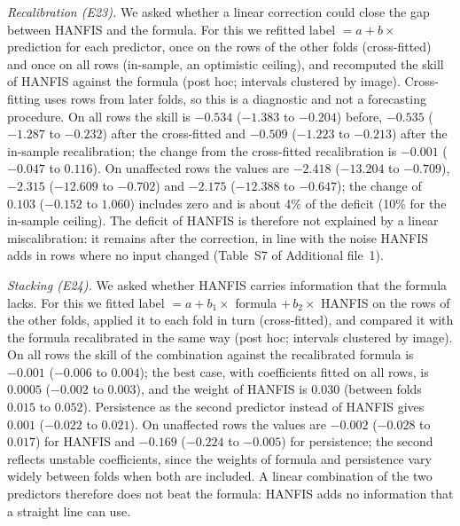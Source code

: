 \documentclass[pdflatex,sn-basic]{sn-jnl}
\theoremstyle{thmstyleone}%
\theoremstyle{thmstyletwo}%
\theoremstyle{thmstylethree}%
\begin{document}
\emph{Recalibration (E23).} We asked whether a linear correction could close the gap between HANFIS and the formula. For this we refitted label $=a+b\times$ prediction for each predictor, once on the rows of the other folds (cross-fitted) and once on all rows (in-sample, an optimistic ceiling), and recomputed the skill of HANFIS against the formula (post hoc; intervals clustered by image). Cross-fitting uses rows from later folds, so this is a diagnostic and not a forecasting procedure. On all rows the skill is $-0.534$ ($-1.383$ to $-0.204$) before, $-0.535$ ($-1.287$ to $-0.232$) after the cross-fitted and $-0.509$ ($-1.223$ to $-0.213$) after the in-sample recalibration; the change from the cross-fitted recalibration is $-0.001$ ($-0.047$ to $0.116$). On unaffected rows the values are $-2.418$ ($-13.204$ to $-0.709$), $-2.315$ ($-12.609$ to $-0.702$) and $-2.175$ ($-12.388$ to $-0.647$); the change of $0.103$ ($-0.152$ to $1.060$) includes zero and is about 4\% of the deficit (10\% for the in-sample ceiling). The deficit of HANFIS is therefore not explained by a linear miscalibration: it remains after the correction, in line with the noise HANFIS adds in rows where no input changed (Table~S7 of Additional file~1).

\emph{Stacking (E24).} We asked whether HANFIS carries information that the formula lacks. For this we fitted label $=a+b_1\times$ formula $+\,b_2\times$ HANFIS on the rows of the other folds, applied it to each fold in turn (cross-fitted), and compared it with the formula recalibrated in the same way (post hoc; intervals clustered by image). On all rows the skill of the combination against the recalibrated formula is $-0.001$ ($-0.006$ to $0.004$); the best case, with coefficients fitted on all rows, is $0.0005$ ($-0.002$ to $0.003$), and the weight of HANFIS is $0.030$ (between folds $0.015$ to $0.052$). Persistence as the second predictor instead of HANFIS gives $0.001$ ($-0.022$ to $0.021$). On unaffected rows the values are $-0.002$ ($-0.028$ to $0.017$) for HANFIS and $-0.169$ ($-0.224$ to $-0.005$) for persistence; the second reflects unstable coefficients, since the weights of formula and persistence vary widely between folds when both are included. A linear combination of the two predictors therefore does not beat the formula: HANFIS adds no information that a straight line can use.
\end{document}
